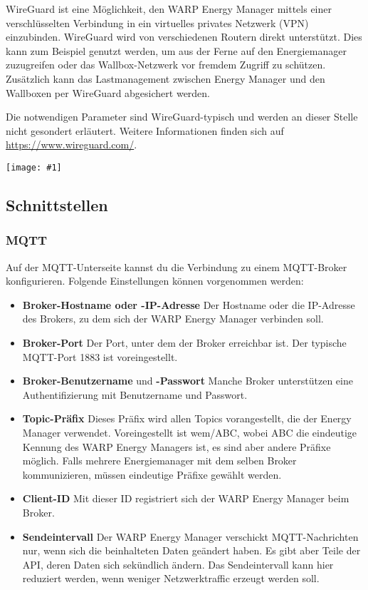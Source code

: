\documentclass[a4paper,10pt]{article}
\newcommand{\gfx}[1]{\texttt{[image: \#1]}}
\begin{document}
\begin{multicols*}{2}
	WireGuard ist eine Möglichkeit, den WARP Energy Manager mittels einer verschlüsselten
	Verbindung in ein virtuelles privates Netzwerk (VPN) einzubinden. WireGuard wird von
	verschiedenen Routern direkt unterstützt. Dies kann zum Beispiel genutzt
	werden, um aus der Ferne auf den Energiemanager zuzugreifen oder das
	Wallbox-Netzwerk vor fremdem Zugriff zu schützen. Zusätzlich kann das
	Lastmanagement zwischen Energy Manager und den Wallboxen per WireGuard abgesichert werden.

	Die notwendigen Parameter sind WireGuard-typisch und werden an dieser Stelle
	nicht gesondert erläutert. Weitere Informationen finden sich auf
	\url{https://www.wireguard.com/}.

	\gfx{./img/resized/web_wireguard}

	\subsection{Schnittstellen}
	\subsubsection{MQTT}
	\label{mqtt-interface}

	Auf der MQTT-Unterseite kannst du die Verbindung zu einem MQTT-Broker konfigurieren. Folgende Einstellungen können vorgenommen werden:
	\begin{itemize}
		\item \textbf{Broker-Hostname oder -IP-Adresse} Der Host\-name oder die
		IP-Adresse des Brokers, zu dem sich der WARP Energy Manager verbinden soll.
		\item \textbf{Broker-Port} Der Port, unter dem der Broker erreichbar ist. Der typische MQTT-Port 1883 ist voreingestellt.
		\item \textbf{Broker-Benutzername} und \textbf{-Passwort} Manche Broker unterstützen eine Authentifizierung mit Benutzername und Passwort.
		\item \textbf{Topic-Präfix} Dieses Präfix wird allen Topics vorangestellt, die der Energy Manager verwendet.
		      Voreingestellt ist wem/ABC, wobei ABC die eindeutige Kennung des
			  WARP Energy Managers ist,
		      es sind aber andere Präfixe möglich.
		      Falls mehrere Energiemanager mit dem selben Broker kommunizieren,
		      müssen eindeutige Präfixe gewählt werden.
		\item \textbf{Client-ID} Mit dieser ID registriert sich der WARP Energy Manager beim Broker.
		\item \textbf{Sendeintervall} Der WARP Energy Manager verschickt MQTT-Nachrichten nur, wenn sich die beinhalteten Daten geändert haben.
			Es gibt aber Teile der API, deren Daten sich sekündlich ändern. Das Sendeintervall kann hier reduziert werden, wenn weniger Netzwerktraffic
			erzeugt werden soll.
	\end{itemize}


\end{multicols*}
\end{document}
